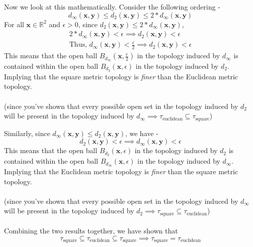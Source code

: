 \begin{frame}
    Now we look at this mathematically. Consider the following ordering -
    \begin{equation*}
        d_\infty(\boldsymbol{x}, \boldsymbol{y}) \leq d_2(\boldsymbol{x}, \boldsymbol{y}) \leq 2*d_\infty(\boldsymbol{x}, \boldsymbol{y})
    \end{equation*}
    For all $\boldsymbol{x} \in \mathbb{R}^2$ and $\epsilon > 0$, since $d_2(\boldsymbol{x}, \boldsymbol{y}) \leq 2*d_\infty(\boldsymbol{x}, \boldsymbol{y})$,
    \begin{gather*}
         2*d_\infty(\boldsymbol{x}, \boldsymbol{y}) < \epsilon \implies d_2(\boldsymbol{x}, \boldsymbol{y}) < \epsilon \\
         \text{Thus, }d_\infty(\boldsymbol{x}, \boldsymbol{y}) < \frac{\epsilon}{2} \implies d_2(\boldsymbol{x}, \boldsymbol{y}) < \epsilon
    \end{gather*}
    This means that the open ball $B_{d_\infty}\left(\boldsymbol{x}, \frac{\epsilon}{2}\right)$ in the topology induced by $d_{\infty}$ is contained within the open ball $B_{d_2}\left(\boldsymbol{x}, \epsilon\right)$ in the topology induced by $d_2$. Implying that the square metric topology is \textit{finer} than the Euclidean metric topology. \\\\
    (since you've shown that every possible open set in the topology induced by $d_2$ will be present in the topology induced by $d_\infty \implies \tau_{\text{euclidean}} \subseteq \tau_{\text{square}}$)
\end{frame}

\begin{frame}
    Similarly, since $d_\infty(\boldsymbol{x}, \boldsymbol{y}) \leq d_2(\boldsymbol{x}, \boldsymbol{y})$, we have -
    \begin{equation*}
        d_2(\boldsymbol{x}, \boldsymbol{y}) < \epsilon \implies d_\infty(\boldsymbol{x}, \boldsymbol{y}) < \epsilon
    \end{equation*}
    This means that the open ball $B_{d_2}\left(\boldsymbol{x}, \epsilon\right)$ in the topology induced by $d_2$ is contained within the open ball $B_{d_\infty}\left(\boldsymbol{x}, \epsilon\right)$ in the topology induced by $d_\infty$. Implying that the Euclidean metric topology is \textit{finer} than the square metric topology. \\\\
    (since you've shown that every possible open set in the topology induced by $d_\infty$ will be present in the topology induced by $d_2 \implies \tau_{\text{square}} \subseteq \tau_{\text{euclidean}}$) \\\\
    Combining the two results together, we have shown that 
    \begin{equation*}
        \tau_{\text{square}} \subseteq \tau_{\text{euclidean}} \subseteq \tau_{\text{square}} \implies \tau_{\text{square}} = \tau_{\text{euclidean}}
    \end{equation*}
\end{frame}

